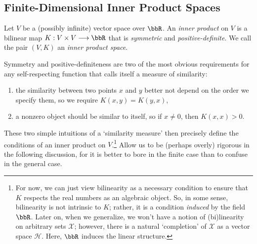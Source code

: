 \documentclass[twoside,11pt]{homework}
\renewcommand{\to}{\longrightarrow}
\begin{document}
\begin{multicols}{2}
\subsection{Finite-Dimensional Inner Product Spaces}
\begin{definition}\label{IP}
  Let $V$ be a (possibly infinite) vector space over $\bbR$. An \emph{inner product} on $V$ is a bilinear map $K : V \times V \to \bbR$
  that is \emph{symmetric} and \emph{positive-definite}. We call the pair $(V,K)$ an \emph{inner product space}.
\end{definition}
Symmetry and positive-definiteness are two of the most obvious requirements for any self-respecting function that calls itself a measure of similarity:
\begin{enumerate}
\item  the similarity between two points $x$ and $y$ better not depend on the order we specify them, so we require $K(x,y) = K(y,x)$,
\item a nonzero object should be similar to itself, so if $x \ne 0$, then $K(x,x) > 0$.
\end{enumerate}
These two simple intuitions of a `similarity measure' then precisely define the conditions of an inner product on $V$.\footnote{For now, we can just view bilinearity as a necessary condition to ensure that $K$ respects the real numbers as an algebraic object. So, in some sense, bilinearity is not intrinsic to $K$; rather, it is a condition \emph{induced} by the field $\bbR$. Later on, when we generalize, we won't have a notion of (bi)linearity on arbitrary sets $\mathcal{X}$; however, there is a natural `completion' of $\mathcal{X}$ as a vector space $\mathcal{H}$. Here, $\bbR$ induces the linear structure.} Allow us to be (perhaps overly) rigorous in the following discussion, for it is better to bore in the finite case than to confuse in the general case.


\end{multicols}
\end{document}
